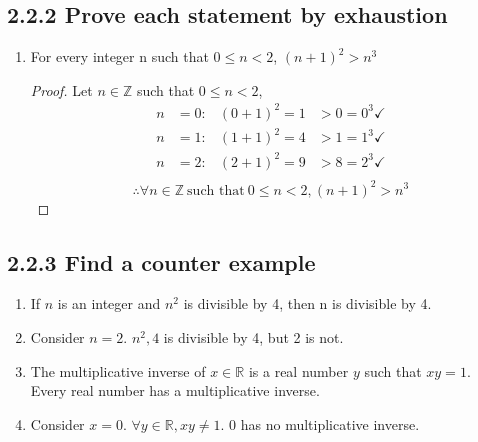





\subsection*{2.2.2 Prove each statement by exhaustion}
\begin{enumerate}
  \item[\bld{a.}] For every integer n such that $0 \leq n < 2$, $(n+1)^2 > n^3$
    \begin{proof}
      Let $n \in \mathbb{Z}$ such that $0 \leq n < 2$,
      \begin{align*}
        n & = 0: & (0+1)^2 = 1 & > 0 = 0^3 \checkmark \\
        n & = 1: & (1+1)^2 = 4 & > 1 = 1^3 \checkmark \\
        n & = 2: & (2+1)^2 = 9 & > 8 = 2^3 \checkmark \\
      \end{align*}
      \[
        \therefore \forall n \in \mathbb{Z}~\text{such that}~0 \leq n < 2, (n+1)^2 > n^3
      \]
    \end{proof}
\end{enumerate}

\subsection*{2.2.3 Find a counter example}
\begin{enumerate}
  \item[\bld{b.}] If $n$ is an integer and $n^2$ is divisible by 4, then n is divisible by 4.
  \item[]  Consider $n=2$. $n^2,4$ is divisible by 4, but 2 is not.
  \item[\bld{e.}] The multiplicative inverse of $x \in \mathbb{R}$ is a real number $y$ such that
    $xy = 1$. Every real number has a multiplicative inverse.
  \item[]  Consider $x=0$. $\forall y \in \mathbb{R}, xy \not = 1$. 0 has no multiplicative inverse.
\end{enumerate}

